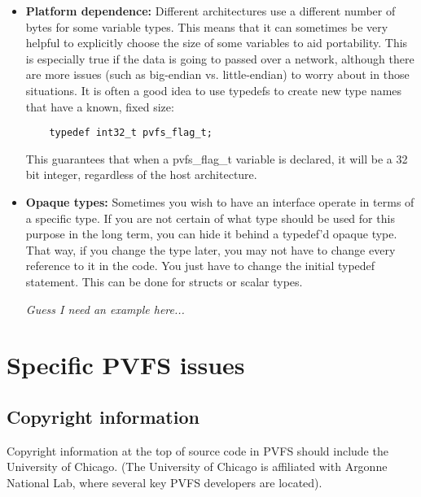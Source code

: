 \documentclass[11pt, letterpaper]{article}
\begin{document}
\begin{itemize}
	\item \textbf{Platform dependence:} Different architectures use a
	different number of bytes for some variable types.  This means that
	it can sometimes be very helpful to explicitly choose the size of
	some variables to aid portability.  This is especially true if the
	data is going to passed over a network, although there are more
	issues (such as big-endian vs. little-endian) to worry about in those 
	situations.  It is often a good idea to use typedefs to create new
	type names that have a known, fixed size:

	\begin{verbatim}
	typedef int32_t pvfs_flag_t;
	\end{verbatim}

	This guarantees that when a pvfs\_flag\_t variable is declared, it
	will be a 32 bit integer, regardless of the host architecture.

	\item \textbf{Opaque types:} Sometimes you wish to have an
	interface operate in terms of a specific type.  If you are not
	certain of what type should be used for this purpose in the long term, you can hide it behind a
	typedef'd opaque type.  That way, if you change the type later, you
	may not have to change every reference to it in the code.  You just
	have to change the initial typedef statement.  This can be done for 
	structs or scalar types.

	\emph{Guess I need an example here...}

\end{itemize}




\section{Specific PVFS issues}

\subsection{Copyright information}
\label{sec:pvfs-copyright}

Copyright information at the top of source code in PVFS should include
the University of Chicago.  (The University of Chicago is affiliated
with Argonne National Lab, where several key PVFS developers are
located).  
\end{document}
